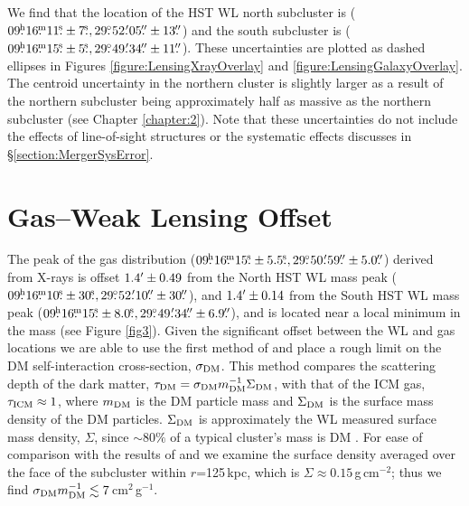 We find that the location of the HST WL north subcluster is ($09\fh16\fm11\fs\pm7\fs, 29\fdg52\farcm05\farcs\pm13\farcs$) and the south subcluster is ($09\fh16\fm15\fs\pm5\fs, 29\fdg49\farcm34\farcs\pm11\farcs$).
These uncertainties are plotted as dashed ellipses in Figures \ref{figure:LensingXrayOverlay} and \ref{figure:LensingGalaxyOverlay}.
The centroid uncertainty in the northern cluster is slightly larger as a result of the northern subcluster being approximately half as massive as the northern subcluster (see Chapter \ref{chapter:2}).
Note that these uncertainties do not include the effects of line-of-sight structures or the systematic effects discusses in \S\ref{section:MergerSysError}.


\section{Gas--Weak Lensing Offset}\label{section:GasWLOffset}

The peak of the gas distribution ($09\fh16\fm15\fs\pm5.5\fs, 29\fdg50\farcm59\farcs\pm5.0\farcs$) derived from X-rays is offset $1.4\mbox{$^\prime$}\pm0.49$ from the North HST WL mass peak ($09\fh16\fm10\fs\pm30\fs, 29\fdg52\farcm10\farcs\pm30\farcs$), and $1.4\mbox{$^\prime$}\pm0.14$ from the South HST WL mass peak ($09\fh16\fm15\fs\pm8.0\fs, 29\fdg49\farcm34\farcs\pm6.9\farcs$), and is located near a local minimum in the mass (see Figure \ref{fig3}).
Given the significant offset between the WL and gas locations we are able to use the first method of \citet{Markevitch:2004dl} and place a rough limit on the DM self-interaction cross-section, $\sigma_{\rm DM}$.
This method compares the scattering depth of the dark matter, $\tau_{\rm DM}=\sigma_{\rm DM}m^{-1}_{\rm DM} \Sigma_{\rm DM}$, with that of the ICM gas, $\tau_{\rm ICM}\approx 1$, where $m_{\rm DM}$ is the DM particle mass and $\Sigma_{\rm DM}$ is the surface mass density of the DM particles.
$\Sigma_{\rm DM}$ is approximately the WL measured surface mass density, $\Sigma$, since $\sim80\%$ of a typical cluster's mass is DM \citep{Diaferio:2008js}.
For ease of comparison with the results of \citet{Markevitch:2004dl} and \citet{Merten:2011gu} we examine the surface density averaged over the face of the subcluster within $r$=125\,kpc, which is $\Sigma\approx0.15$\,g\,cm$^{-2}$; thus we find $\sigma_{\rm DM} m_{\rm DM}^{-1} \lesssim 7$\,cm$^2$\,g$^{-1}$. 


